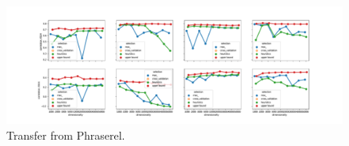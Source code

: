 \begin{figure}
  \centering
    \includegraphics[width=\textwidth]{supplement/figures/PhraseRel-transfer}
    \caption{Transfer from Phraserel.}
    \label{fig:phraserel-transfer}
\end{figure}

